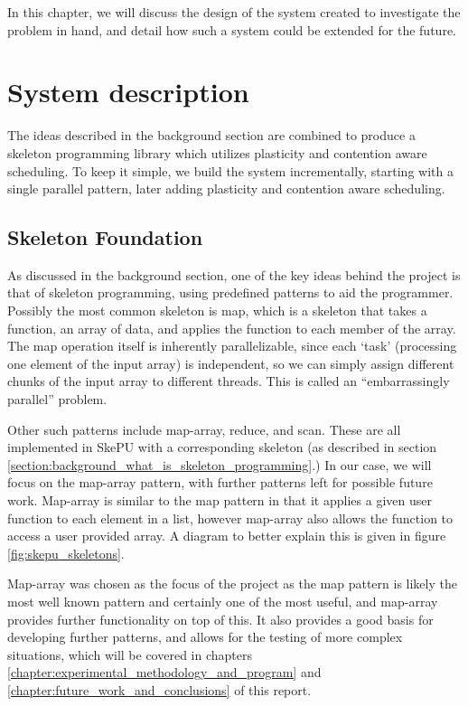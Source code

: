 
In this chapter, we will discuss the design of the system created to investigate the problem in hand, and detail how such a system could be extended for the future.



\section{System description}

The ideas described in the background section are combined to produce a skeleton programming library which utilizes plasticity and contention aware scheduling. To keep it simple, we build the system incrementally, starting with a single parallel pattern, later adding plasticity and contention aware scheduling. 



\subsection{Skeleton Foundation}
\label{section:design_skeleton_foundation}

As discussed in the background section, one of the key ideas behind the project is that of skeleton programming, using predefined patterns to aid the programmer. Possibly the most common skeleton is map, which is a skeleton that takes a function, an array of data, and applies the function to each member of the array. The map operation itself is inherently parallelizable, since each `task' (processing one element of the input array) is independent, so we can simply assign different chunks of the input array to different threads. This is called an ``embarrassingly parallel'' problem. 

Other such patterns include map-array, reduce, and scan. These are all implemented in SkePU with a corresponding skeleton (as described in section \ref{section:background_what_is_skeleton_programming}.) In our case, we will focus on the map-array pattern, with further patterns left for possible future work. Map-array is similar to the map pattern in that it applies a given user function to each element in a list, however map-array also allows the function to access a user provided array. A diagram to better explain this is given in figure \ref{fig:skepu_skeletons}.

Map-array was chosen as the focus of the project as the map pattern is likely the most well known pattern and certainly one of the most useful, and map-array provides further functionality on top of this. It also provides a good basis for developing further patterns, and allows for the testing of more complex situations, which will be covered in chapters \ref{chapter:experimental_methodology_and_program} and \ref{chapter:future_work_and_conclusions} of this report.




